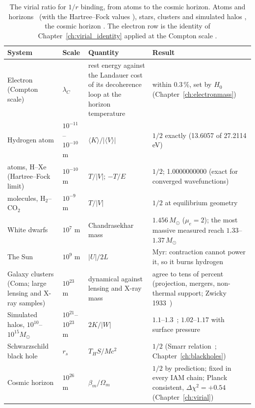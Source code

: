 \begin{table}[htbp]\centering\small
\caption{The virial ratio for $1/r$ binding, from atoms to the cosmic horizon. Atoms and horizons \derived\ (with the Hartree--Fock values \calc), stars,
clusters and simulated halos \observed, the cosmic horizon \prediction. The electron row is the identity of Chapter~\ref{ch:virial_identity} applied at the
Compton scale \conjecture.}\label{tab:virial_domains}
\begin{tabularx}{\linewidth}{>{\raggedright\arraybackslash}X>{\raggedright\arraybackslash}p{1.6cm}>{\raggedright\arraybackslash}X>{\raggedright\arraybackslash}X}
\hline
System & Scale & Quantity & Result\\\hline
Electron (Compton scale) & $\lambda_C$ & rest energy against the Landauer cost of its decoherence loop at the horizon temperature & within $0.3\,\%$, set by $H_0$ (Chapter~\ref{ch:electronmass})\\
Hydrogen atom & $10^{-11}$--$10^{-10}$ m & $\langle K\rangle/|\langle V\rangle|$ & $1/2$ exactly (13.6057 of 27.2114\,eV)\\
20 atoms, H--Xe (Hartree--Fock limit) & $10^{-10}$ m & $T/|V|$; $-T/E$ & $1/2$; 1.0000000000 (exact for converged wavefunctions)\\
10 molecules, H$_2$--CO$_2$ & $10^{-9}$ m & $T/|V|$ & $1/2$ at equilibrium geometry\\
White dwarfs & $10^{7}$ m & Chandrasekhar mass~\cite{Chandrasekhar1931} & $1.456\,M_\odot$ ($\mu_e=2$); the most massive measured reach $1.33$--$1.37\,M_\odot$~\cite{Kepler2007,Caiazzo2021}\\
The Sun & $10^{9}$ m & $|U|/2L$~\cite{Kippenhahn2012} & 24 Myr: contraction cannot power it, so it burns hydrogen\\
Galaxy clusters (Coma; large lensing and X-ray samples) & $10^{23}$ m & dynamical against lensing and X-ray mass & agree to tens of percent (projection, mergers, non-thermal support; Zwicky 1933~\cite{Zwicky1933})\\
Simulated halos, $10^{10}$--$10^{15}M_\odot$ & $10^{21}$--$10^{23}$ m & $2K/|W|$ & $1.1$--$1.3$~\cite{Bett2007,Neto2007,Power2012}; $1.02$--$1.17$ with surface pressure~\cite{Klypin2016}\\
Schwarzschild black hole & $r_s$ & $T_HS/Mc^2$ & $1/2$ (Smarr relation~\cite{Smarr1973}; Chapter~\ref{ch:blackholes})\\
Cosmic horizon & $10^{26}$ m & $\beta_m/\Omega_m$ & $1/2$ by prediction; fixed in every IAM chain; Planck consistent, $\Delta\chi^2=+0.54$ (Chapter~\ref{ch:virial})\\\hline
\end{tabularx}
\end{table}

